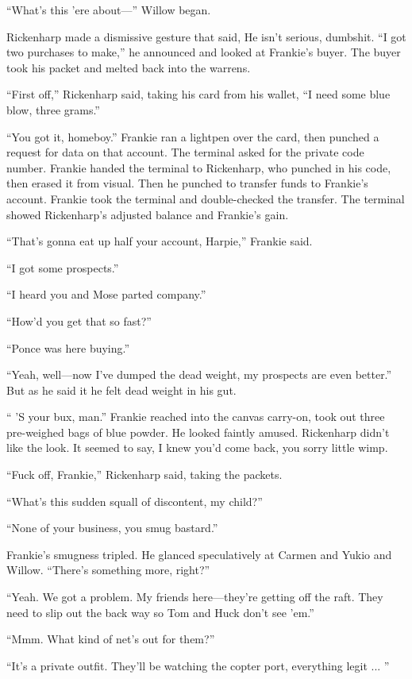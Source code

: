 ``What's this 'ere about—'' Willow began.

Rickenharp made a dismissive gesture that said, He isn't serious, dumbshit. ``I got two purchases to make,'' he announced and looked at Frankie's buyer. The buyer took his packet and melted back into the warrens.

``First off,'' Rickenharp said, taking his card from his wallet, ``I need some blue blow, three grams.''

``You got it, homeboy.'' Frankie ran a lightpen over the card, then punched a request for data on that account. The terminal asked for the private code number. Frankie handed the terminal to Rickenharp, who punched in his code, then erased it from visual. Then he punched to transfer funds to Frankie's account. Frankie took the terminal and double-checked the transfer. The terminal showed Rickenharp's adjusted balance and Frankie's gain.

``That's gonna eat up half your account, Harpie,'' Frankie said.

``I got some prospects.''

``I heard you and Mose parted company.''

``How'd you get that so fast?''

``Ponce was here buying.''

``Yeah, well—now I've dumped the dead weight, my prospects are even better.'' But as he said it he felt dead weight in his gut.

`` 'S your bux, man.'' Frankie reached into the canvas carry-on, took out three pre-weighed bags of blue powder. He looked faintly amused. Rickenharp didn't like the look. It seemed to say, I knew you'd come back, you sorry little wimp.

``Fuck off, Frankie,'' Rickenharp said, taking the packets.

``What's this sudden squall of discontent, my child?''

``None of your business, you smug bastard.''

Frankie's smugness tripled. He glanced speculatively at Carmen and Yukio and Willow. ``There's something more, right?''

``Yeah. We got a problem. My friends here—they're getting off the raft. They need to slip out the back way so Tom and Huck don't see 'em.''

``Mmm. What kind of net's out for them?''

``It's a private outfit. They'll be watching the copter port, everything legit ... ''

